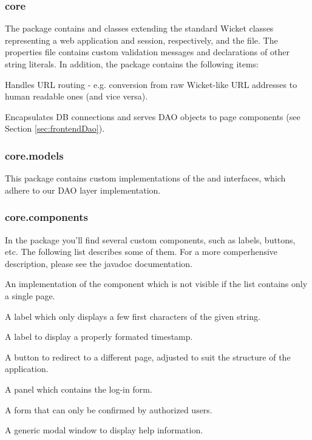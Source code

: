 \subsubsection{core}

The  package contains  and \linebreak classes extending the standard Wicket classes representing a web application and session, respectively, and the  file. The properties file contains custom validation messages and declarations of other string literals. In addition, the package contains the following items:

\begin{description}[style=nextline,font=\ttfamily]
	\item[URLRouter] Handles URL routing - e.g. conversion from raw Wicket-like URL addresses to human readable ones (and vice versa).
	\item[DaoLookupFactory] Encapsulates DB connections and serves DAO objects to page components (see Section \ref{sec:frontendDao}).
\end{description}

\subsubsection{core.models}

This package contains custom implementations of the  and  interfaces, which adhere to our DAO layer implementation.

\subsubsection{core.components}

In the  package you'll find several custom components, such as labels, buttons, etc. The following list describes some of them. For a more comperhensive description, please see the javadoc documentation.

\begin{description}[style=nextline,font=\ttfamily]
	\item[UnobtrusivePagingNavigator] An implementation of the  component which is not visible if the list contains only a single page.
	\item[TruncatedLabel] A label which only displays a few first characters of the given string.
	\item[TimestampLabel] A label to display a properly formated timestamp.
	\item[RedirectButton] A button to redirect to a different page, adjusted to suit the structure of the \FE application.
	\item[LogInPanel] A panel which contains the log-in form.
	\item[LimitedEditingForm] A form that can only be confirmed by authorized users.
	\item[HelpWindow] A generic modal window to display help information.
\end{description}

